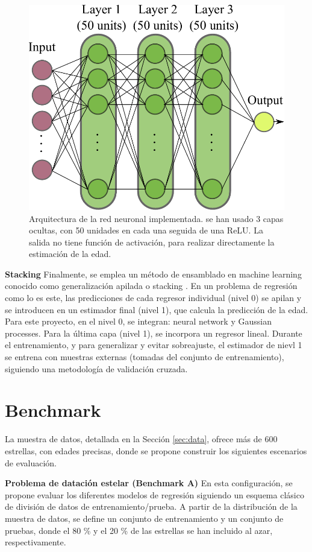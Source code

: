 \begin{figure}[t]
\begin{center}
\includegraphics[width=0.6\linewidth]{Figuras/nnet.pdf}
\end{center}
\caption{Arquitectura de la red neuronal implementada. se han usado 3 capas ocultas, con 50 unidades en cada una seguida de una ReLU. La salida no tiene función de activación, para realizar directamente la estimación de la edad.}
\label{fig:neural_network}
\end{figure}

\textbf{Stacking} {} Finalmente, se emplea un método de ensamblado en machine learning conocido como generalización apilada o stacking \cite{Wolpert1992}. En un problema de regresión como lo es este, las predicciones de cada regresor individual (nivel 0) se apilan y se introducen en un estimador final (nivel 1), que calcula la predicción de la edad. Para este proyecto, en el nivel 0, se integran: neural network y Gaussian processes. Para la última capa (nivel 1), se incorpora un regresor lineal. Durante el entrenamiento, y para generalizar y evitar sobreajuste, el estimador de nievl 1 se entrena con muestras externas (tomadas del conjunto de entrenamiento), siguiendo una metodología de validación cruzada.

\section{Benchmark}
\label{sec:benchmark}

La muestra de datos, detallada en la Sección \ref{sec:data}, ofrece más de 600 estrellas, con edades precisas, donde se propone construir los siguientes escenarios de evaluación.

\textbf{Problema de datación estelar (Benchmark A)} {} En esta configuración, se propone evaluar los diferentes modelos de regresión siguiendo un esquema clásico de división de datos de entrenamiento/prueba. A partir de la distribución de la muestra de datos, se define un conjunto de entrenamiento y un conjunto de pruebas, donde el  80 \% y el 20 \% de las estrellas se han incluido al azar, respectivamente.

